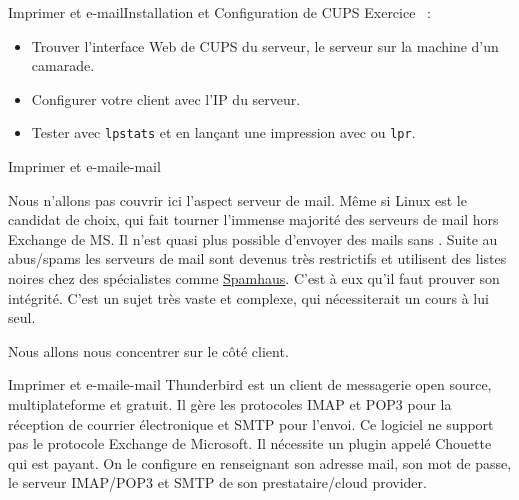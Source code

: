 \documentclass{beamer}
\begin{document}
    \begin{frame}{Imprimer et e-mail}{Installation et Configuration de CUPS}
        Exercice \execcounterdispinc~:
        \begin{itemize}
            \item Trouver l'interface Web de CUPS du serveur, le serveur sur la machine d'un camarade.
            \item Configurer votre client avec l'IP du serveur.
            \item Tester avec \lstinline{lpstats} et en lançant une impression avec ou \lstinline{lpr}.
        \end{itemize}
    \end{frame}

    \begin{frame}{Imprimer et e-mail}{e-mail}
        \begin{dangercolorbox}
            Nous n'allons pas couvrir ici l'aspect serveur de mail. Même si Linux est le candidat de choix, qui fait tourner l'immense majorité des serveurs de mail hors Exchange de MS.
            \bigbreak
            Il n'est quasi plus possible d'envoyer des mails sans .
            Suite au abus/spams les serveurs de mail sont devenus très restrictifs et utilisent des listes noires chez des spécialistes comme \href{https://www.spamhaus.org/}{Spamhaus}.
            C'est à eux qu'il faut prouver son intégrité.
            \bigbreak
            C'est un sujet très vaste et complexe, qui nécessiterait un cours à lui seul.
        \end{dangercolorbox}
        Nous allons nous concentrer sur le côté client.
    \end{frame}

    \begin{frame}{Imprimer et e-mail}{e-mail}
        Thunderbird est un client de messagerie open source, multiplateforme et gratuit.
        Il gère les protocoles IMAP et POP3 pour la réception de courrier électronique et SMTP pour l'envoi.
        \bigbreak
        Ce logiciel ne support pas le protocole Exchange de Microsoft.
        Il nécessite un plugin appelé Chouette qui est payant.
        \bigbreak
        On le configure en renseignant son adresse mail, son mot de passe, le serveur IMAP/POP3 et SMTP de son prestataire/cloud provider.
    \end{frame}
\end{document}
